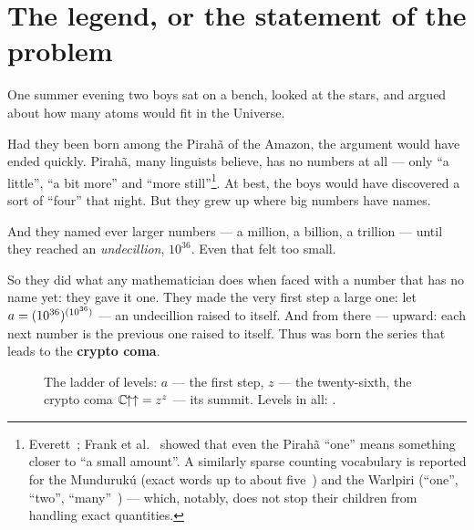 \section{The legend, or the statement of the problem}

One summer evening two boys sat on a bench, looked at the stars, and argued about how
many atoms would fit in the Universe.

Had they been born among the Pirah\~a of the Amazon, the argument would have ended quickly.
Pirah\~a, many linguists believe, has no numbers at all --- only ``a little'', ``a bit
more'' and ``more still''\footnote{Everett~\cite{everett2005}; Frank et al.~\cite{frank2008}
showed that even the Pirah\~a ``one'' means something closer to ``a small amount''. A
similarly sparse counting vocabulary is reported for the Munduruk\'u (exact words up to
about five~\cite{pica2004}) and the Warlpiri (``one'', ``two'', ``many''~\cite{butterworth2008})
--- which, notably, does not stop their children from handling exact quantities.}. At best, the boys would have discovered a sort of
``four'' that night. But they grew up where big numbers have names.

And they named ever larger numbers --- a million, a billion, a trillion --- until they
reached an \emph{undecillion}, \(10^{36}\). Even that felt too small.

So they did what any mathematician does when faced with a number that has no name yet:
they gave it one. They made the very first step a large one: let
\(a = (10^{36})^{(10^{36})}\) --- an undecillion raised to itself. And from there --- upward: each next
number is the previous one raised to itself. Thus was born the series that leads to the
\textbf{crypto coma}.

\begin{figure}[h]
\centering
{}
\caption{The ladder of levels: \(a\) --- the first step, \(z\) --- the twenty-sixth, the
crypto coma \(\mathbb{C}\mkern-1.5mu{\uparrow\uparrow} = z^{z}\) --- its summit. Levels in all: \nlevels.}
\label{fig:ladder}
\end{figure}
